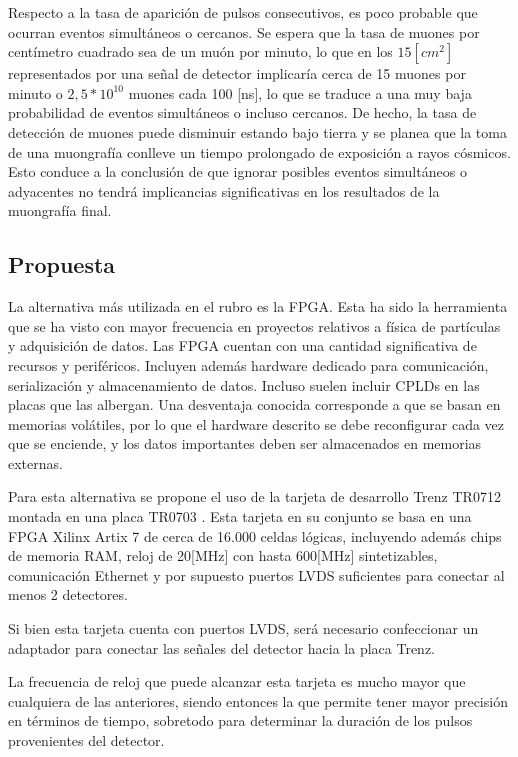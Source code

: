 	Respecto a la tasa de aparición de pulsos consecutivos, es poco probable que ocurran eventos simultáneos o cercanos. Se espera que la tasa de muones por centímetro cuadrado sea de un muón por minuto, lo que en los $15[cm^2]$ representados por una señal de detector implicaría cerca de 15 muones por minuto o $2,5*10^{10}$ muones cada 100 [ns], lo que se traduce a una muy baja probabilidad de eventos simultáneos o incluso cercanos. De hecho, la tasa de detección de muones puede disminuir estando bajo tierra y se planea que la toma de una muongrafía conlleve un tiempo prolongado de exposición a rayos cósmicos. Esto conduce a la conclusión de que ignorar posibles eventos simultáneos o adyacentes no tendrá implicancias significativas en los resultados de la muongrafía final.

\newpage
\subsection{Propuesta}
	La alternativa más utilizada en el rubro es la FPGA. Esta ha sido la herramienta que se ha visto con mayor frecuencia en proyectos relativos a física de partículas y adquisición de datos. 
	Las FPGA cuentan con una cantidad significativa de recursos y periféricos. Incluyen además hardware dedicado para comunicación, serialización y almacenamiento de datos. Incluso suelen incluir CPLDs en las placas que las albergan. Una desventaja conocida corresponde a que se basan en memorias volátiles, por lo que el hardware descrito se debe reconfigurar cada vez que se enciende, y los datos importantes deben ser almacenados en memorias externas.
	
	Para esta alternativa se propone el uso de la tarjeta de desarrollo Trenz TR0712 \cite{TrenzElectronic2019TR07012Wiki} montada en una placa TR0703 \cite{TrenzElectronic2019TR0703Wiki}. Esta tarjeta en su conjunto se basa en una FPGA Xilinx Artix 7 \cite{Xilinx20107DS180} de cerca de 16.000 celdas lógicas, incluyendo además chips de memoria RAM, reloj de 20[MHz] con hasta 600[MHz] sintetizables, comunicación Ethernet y por supuesto puertos LVDS suficientes para conectar al menos 2 detectores.
	
	Si bien esta tarjeta cuenta con puertos LVDS, será necesario confeccionar un adaptador para conectar las señales del detector hacia la placa Trenz.
	
	La frecuencia de reloj que puede alcanzar esta tarjeta es mucho mayor que cualquiera de las anteriores, siendo entonces la que permite tener mayor precisión en términos de tiempo, sobretodo para determinar la duración de los pulsos provenientes del detector.
	
